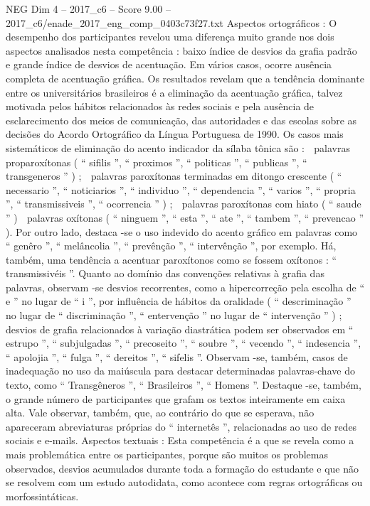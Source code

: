 \begin{textsample}{NEG Dim 4 – 2017\_c6 – Score 9.00 – 2017\_c6/enade\_2017\_eng\_comp\_0403c73f27.txt}
Aspectos ortográficos : O desempenho dos participantes revelou uma diferença muito grande nos dois aspectos analisados nesta competência : baixo índice de desvios da grafia padrão e grande índice de desvios de acentuação.
Em vários casos, ocorre ausência completa de acentuação gráfica.
Os resultados revelam que a tendência dominante entre os universitários brasileiros é a eliminação da acentuação gráfica, talvez motivada pelos hábitos relacionados às redes sociais e pela ausência de esclarecimento dos meios de comunicação, das autoridades e das escolas sobre as decisões do Acordo Ortográfico da Língua Portuguesa de 1990.
Os casos mais sistemáticos de eliminação do acento indicador da sílaba tônica são :  palavras proparoxítonas ( “ sifilis ”, “ proximos ”, “ politicas ”, “ publicas ”, “ transgeneros ” ) ;  palavras paroxítonas terminadas em ditongo crescente ( “ necessario ”, “ noticiarios ”, “ individuo ”, “ dependencia ”, “ varios ”, “ propria ”, “ transmissiveis ”, “ ocorrencia ” ) ;  palavras paroxítonas com hiato ( “ saude ” )  palavras oxítonas ( “ ninguem ”, “ esta ”, “ ate ”, “ tambem ”, “ prevencao ” ).
Por outro lado, destaca -se o uso indevido do acento gráfico em palavras como “ genêro ”, “ melâncolia ”, “ prevênção ”, “ intervênção ”, por exemplo.
Há, também, uma tendência a acentuar paroxítonos como se fossem oxítonos : “ transmissivéis ”.
Quanto ao domínio das convenções relativas à grafia das palavras, observam -se desvios recorrentes, como a hipercorreção pela escolha de “ e ” no lugar de “ i ”, por influência de hábitos da oralidade ( “ descriminação ” no lugar de “ discriminação ”, “ entervenção ” no lugar de “ intervenção ” ) ; desvios de grafia relacionados à variação diastrática podem ser observados em “ estrupo ”, “ subjulgadas ”, “ precoseito ”, “ soubre ”, “ vecendo ”, “ indesencia ”, “ apolojia ”, “ fulga ”, “ dereitos ”, “ sifelis ”.
Observam -se, também, casos de inadequação no uso da maiúscula para destacar determinadas palavras-chave do texto, como “ Transgêneros ”, “ Brasileiros ”, “ Homens ”.
Destaque -se, também, o grande número de participantes que grafam os textos inteiramente em caixa alta.
Vale observar, também, que, ao contrário do que se esperava, não apareceram abreviaturas próprias do “ internetês ”, relacionadas ao uso de redes sociais e e-mails.
Aspectos textuais : Esta competência é a que se revela como a mais problemática entre os participantes, porque são muitos os problemas observados, desvios acumulados durante toda a formação do estudante e que não se resolvem com um estudo autodidata, como acontece com regras ortográficas ou morfossintáticas.

\end{textsample}
